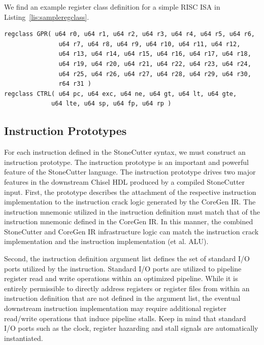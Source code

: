 \documentclass{article}
\begin{document}
We find an example register class definition for a simple RISC ISA in Listing~\ref{lis:sampleregclass}.  

\vspace{0.125in}
\begin{lstlisting}[frame=single,style=base,caption={Sample Register Class Definition},captionpos=b,label={lis:sampleregclass}]
regclass GPR( u64 r0, u64 r1, u64 r2, u64 r3, u64 r4, u64 r5, u64 r6, 
		       u64 r7, u64 r8, u64 r9, u64 r10, u64 r11, u64 r12, 
		       u64 r13, u64 r14, u64 r15, u64 r16, u64 r17, u64 r18,
		       u64 r19, u64 r20, u64 r21, u64 r22, u64 r23, u64 r24, 
		       u64 r25, u64 r26, u64 r27, u64 r28, u64 r29, u64 r30,
		       r64 r31 )
regclass CTRL( u64 pc, u64 exc, u64 ne, u64 gt, u64 lt, u64 gte,
			 u64 lte, u64 sp, u64 fp, u64 rp )
\end{lstlisting}

\clearpage
\subsection{Instruction Prototypes}
\label{sec:InstructionPrototypes}

For each instruction defined in the StoneCutter syntax, we must construct 
an instruction prototype.  The instruction prototype is an important and powerful 
feature of the StoneCutter language.  The instruction prototype drives two major 
features in the downstream Chisel HDL produced by a compiled StoneCutter input.  
First, the prototype describes the attachment of the respective instruction implementation 
to the instruction crack logic generated by the CoreGen IR.  The instruction mnemonic 
utilized in the instruction definition must match that of the instruction mnemonic defined 
in the CoreGen IR.  In this manner, the combined StoneCutter and CoreGen IR infrastructure 
logic can match the instruction crack implementation and the instruction implementation (et al. ALU).  

Second, the instruction definition argument list defines the set of standard I/O ports utilized by the 
instruction.  Standard I/O ports are utilized to pipeline register read and write operations within an 
optimized pipeline.  While it is entirely permissible to directly address registers or register files 
from within an instruction definition that are not defined in the argument list, the eventual downstream 
instruction implementation may require additional register read/write operations that induce pipeline 
stalls.  Keep in mind that standard I/O ports such as the clock, register hazarding and stall signals 
are automatically instantiated.  
\end{document}
